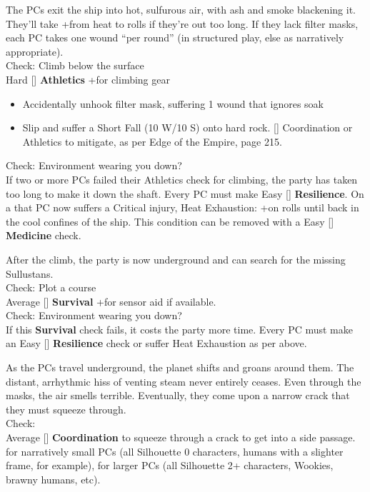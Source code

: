 \documentclass{book}
\newcommand{\df}{\difficulty}
\begin{document}
\begin{multicols}{2}
The PCs exit the ship into hot, sulfurous air, with ash and smoke blackening it. They’ll take +\setback from heat to rolls if they’re out too long. If they lack filter masks, each PC takes one wound ``per round'' (in structured play, else as narratively appropriate).\\
Check: Climb below the surface\\
Hard [\df\df\df] \textbf{Athletics} +\boost for climbing gear
\begin{itemize}
  \item \threat\threat Accidentally unhook filter mask, suffering 1 wound that ignores soak
  \item \despair Slip and suffer a Short Fall (10 W/10 S) onto hard rock.  [\df\df] Coordination or Athletics to mitigate, as per Edge of the Empire, page 215.
\end{itemize}
Check: Environment wearing you down?\\
If two or more PCs failed their Athletics check for climbing, the party has taken too long to make it down the shaft. Every PC must make Easy [\df] \textbf{Resilience}. On a \failure that PC now suffers a Critical injury, Heat Exhaustion: +\setback on rolls until back in the cool confines of the ship. This condition can be removed with a Easy [\df] \textbf{Medicine} check.

After the climb, the party is now underground and can search for the missing Sullustans.\\
Check: Plot a course\\
Average [\df\df] \textbf{Survival} +\boost for sensor aid if available.\\
Check: Environment wearing you down?\\
If this \textbf{Survival} check fails, it costs the party more time. Every PC must make an Easy [\df] \textbf{Resilience} check or suffer Heat Exhaustion as per above.

As the PCs travel underground, the planet shifts and groans around them. The distant, arrhythmic hiss of venting steam never entirely ceases. Even through the masks, the air smells terrible. Eventually, they come upon a narrow crack that they must squeeze through.\\
Check:\\
Average [\df\df] \textbf{Coordination} to squeeze through a crack to get into a side passage. \boost for narratively small PCs (all Silhouette 0 characters, humans with a slighter frame, for example), \setback for larger PCs (all Silhouette 2+ characters, Wookies, brawny humans, etc).


\end{multicols}
\end{document}
